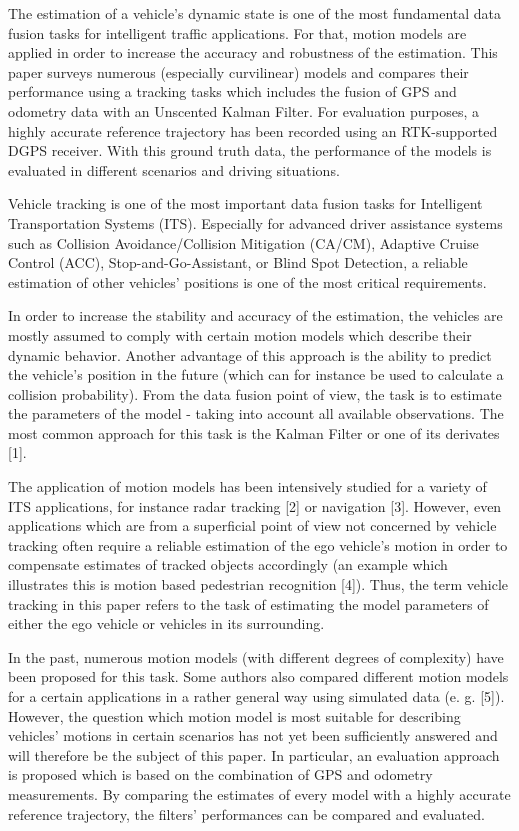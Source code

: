 The estimation of a vehicle's dynamic state is one of the most fundamental data fusion tasks for intelligent traffic applications. For that, motion models are applied in order to increase the accuracy and robustness of the estimation. This paper surveys numerous (especially curvilinear) models and compares their performance using a tracking tasks which includes the fusion of GPS and odometry data with an Unscented Kalman Filter. For evaluation purposes, a highly accurate reference trajectory has been recorded using an RTK-supported DGPS receiver. With this ground truth data, the performance of the models is evaluated in different scenarios and driving situations.

Vehicle tracking is one of the most important data fusion tasks for Intelligent Transportation Systems (ITS). Especially for advanced driver assistance systems such as Collision Avoidance/Collision Mitigation (CA/CM), Adaptive Cruise Control (ACC), Stop-and-Go-Assistant, or Blind Spot Detection, a reliable estimation of other vehicles' positions is one of the most critical requirements.

In order to increase the stability and accuracy of the estimation, the vehicles are mostly assumed to comply with certain motion models which describe their dynamic behavior. Another advantage of this approach is the ability to predict the vehicle's position in the future (which can for instance be used to calculate a collision probability). From the data fusion point of view, the task is to estimate the parameters of the model - taking into account all available observations. The most common approach for this task is the Kalman Filter or one of its derivates [1].

The application of motion models has been intensively studied for a variety of ITS applications, for instance radar tracking [2] or navigation [3]. However, even applications which are from a superficial point of view not concerned by vehicle tracking often require a reliable estimation of the ego vehicle's motion in order to compensate estimates of tracked objects accordingly (an example which illustrates this is motion based pedestrian recognition [4]). Thus, the term vehicle tracking in this paper refers to the task of estimating the model parameters of either the ego vehicle or vehicles in its surrounding.

In the past, numerous motion models (with different degrees of complexity) have been proposed for this task. Some authors also compared different motion models for a certain applications in a rather general way using simulated data (e. g. [5]). However, the question which motion model is most suitable for describing vehicles' motions in certain scenarios has not yet been sufficiently answered and will therefore be the subject of this paper. In particular, an evaluation approach is proposed which is based on the combination of GPS and odometry measurements. By comparing the estimates of every model with a highly accurate reference trajectory, the filters' performances can be compared and evaluated.

